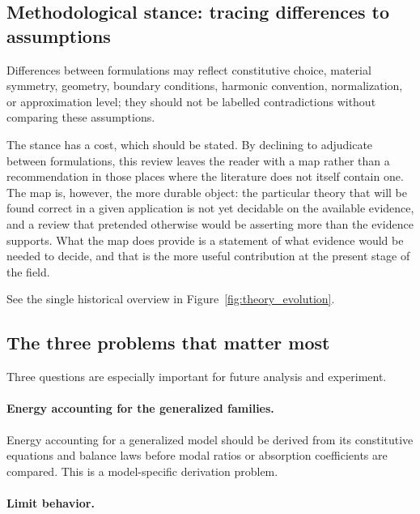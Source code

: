 \subsection{Methodological stance: tracing differences to assumptions}

\label{sec:17.3}

Differences between formulations may reflect constitutive choice, material symmetry, geometry, boundary conditions, harmonic convention, normalization, or approximation level; they should not be labelled contradictions without comparing these assumptions.

The stance has a cost, which should be stated. By declining to adjudicate between formulations, this review leaves the reader with a map rather than a recommendation in those places where the literature does not itself contain one. The map is, however, the more durable object: the particular theory that will be found correct in a given application is not yet decidable on the available evidence, and a review that pretended otherwise would be asserting more than the evidence supports. What the map does provide is a statement of what evidence would be needed to decide, and that is the more useful contribution at the present stage of the field.

See the single historical overview in Figure~\ref{fig:theory_evolution}.

\subsection{The three problems that matter most}

\label{sec:17.4}

Three questions are especially important for future analysis and experiment.

\paragraph{Energy accounting for the generalized families.}

Energy accounting for a generalized model should be derived from its constitutive equations and balance laws before modal ratios or absorption coefficients are compared. This is a model-specific derivation problem.

\paragraph{Limit behavior.}


